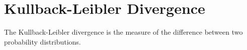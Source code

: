 \section{Kullback-Leibler Divergence}

The Kullback-Leibler divergence is the measure of the difference between two probability distributions.
